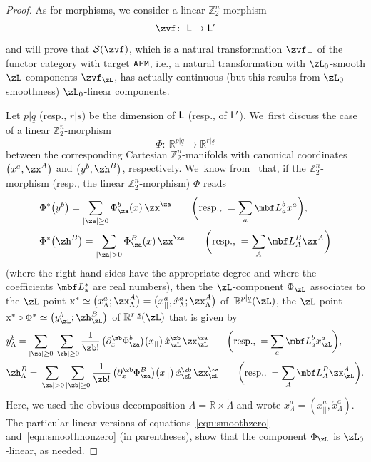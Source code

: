 \documentclass[pdftex]{sigma}%
\newcommand{\R}{{\mathbb R}}
\newcommand{\Z}{{\mathbb Z}}
\def\ul{\underline}
\def\ul{\underline}
\newcommand{\0}{\otimes}
\newcommand{\z}{\Z_2^n}
\numberwithin{equation}{section}
\begin{document}
\begin{proof}
As for morphisms, we consider a linear $\z$-morphism
\[
\zvf\colon\ {\sf L}\to{\sf L}'
\]
and will prove that $\mathcal{S}(\zvf)$, which is a natural transformation $\zvf_-$ of the functor category with target $\tt AFM$, i.e., a natural transformation with $\zL_0$-smooth $\zL$-components $\zvf_\zL$, has actually continuous (but this results from $\zL_0$-smoothness) $\zL_0$-linear components.

Let $p|\ul q$ (resp., $r|\ul s$) be the dimension of $\sf L$ (resp., of $\sf L'$). We~first discuss the case of a linear $\z$-morphism
\[
\Phi\colon\ \R^{p|\ul q}\to \R^{r|\ul s}
\]
between the corresponding Cartesian $\z$-manifolds with canonical coordinates $\big(x^a,\zx^A\big)$ and $\big(y^b,\zh^B\big)$, respectively. We~know from~\cite{Bruce:2019b} that, if the $\z$-morphism (resp., the linear $\z$-morphism) $\Phi$ reads
%
\begin{subequations}
\begin{align}
& \Phi^*\big(y^b\big)=\sum_{|\za|\ge 0}\Phi_\za^b(x)\, \zx^\za\qquad
\bigg(\text{resp.,}\;=\sum_{a}{\mbf L}^b_a x^a\bigg),\label{coeffy}
\\
& \Phi^*\big(\zh^B\big)=\sum_{|\za|> 0}\Phi_\za^B(x)\, \zx^\za\qquad
\bigg(\text{resp.,}\;=\sum_A {\mbf L}^B_A\zx^A\bigg)\label{coeffh}
\end{align}
\end{subequations}
%
(where the right-hand sides have the appropriate degree and where the coefficients $\mbf L^{\ast}_\ast$ are real numbers), then the $\zL$-component $\Phi_\zL$ associates to the $\zL$-point ${\rm x}^*\simeq \big(x^a_\Lambda;\zx^A_\Lambda\big) =\big(x^a_{||},\mathring{x}_\Lambda^a;\zx^A_\Lambda \big)$ of~$\R^{p|\ul{q}}(\zL)$, the $\zL$-point ${\rm x}^*\circ\Phi^*\simeq \big(y_\zL^b;\zh_\zL^B\big)$ of $\R^{r|\ul{s}}(\zL)$ that is given by
%
\begin{subequations}
\begin{align}
& y^b_\Lambda = \sum_{|\za|\ge 0}\sum_{|\zb|\ge 0}\frac{1}{\zb!}\,\big(\partial_{x}^\zb\Phi_\za^b\big)\big(x_{||}\big)\,\mathring{x}_\zL^\zb\,\zx_\zL^\za\qquad
\bigg(\text{resp.,}\;=\sum_{a}{\mbf L}^b_a x_\zL^a\bigg), \label{eqn:smoothzero}
\\
& \zh^B_\Lambda =\sum_{|\za|> 0}\sum_{|\zb|\ge 0}\frac{1}{\zb!}\,\big(\partial_x^\zb\Phi_\za^B\big)\big(x_{||}\big)\,\mathring{x}_\zL^\zb\,\zx_\zL^\za\qquad
\bigg(\text{resp.,}\;=\sum_A {\mbf L}^B_A\zx_\zL^A\bigg). \label{eqn:smoothnonzero}
\end{align}
\end{subequations}
Here, we used the obvious decomposition $\Lambda = \R \times \mathring{\Lambda}$ and wrote $x^a_\Lambda = (x^a_{||}, \mathring{x}^a_{\Lambda})$. The particular linear versions of equations~\eqref{eqn:smoothzero} and~\eqref{eqn:smoothnonzero} (in parentheses), show that the component $\Phi_\zL$ is $\zL_0$-linear, as needed.


\end{proof}
\end{document}

